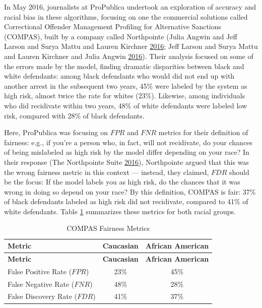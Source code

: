 \documentclass[]{krantz}
\begin{document}
In May 2016, journalists at ProPublica undertook an exploration of
accuracy and racial bias in these algorithms, focusing on one the
commercial solutions called Correctional Offender Management Profiling
for Alternative Sanctions (COMPAS), built by a company called
Northpointe (Julia Angwin and Jeff Larson and Surya Mattu and Lauren
Kirchner \protect\hyperlink{ref-angwin2016}{2016}; Jeff Larson and Surya
Mattu and Lauren Kirchner and Julia Angwin
\protect\hyperlink{ref-larson2016}{2016}). Their analysis focused on
some of the errors made by the model, finding dramatic disparities
between black and white defendants: among black defendants who would did
not end up with another arrest in the subsequent two years, 45\% were
labeled by the system as high risk, almost twice the rate for whites
(23\%). Likewise, among individuals who did recidivate within two years,
48\% of white defendants were labeled low risk, compared with 28\% of
black defendants.

Here, ProPublica was focusing on \(FPR\) and \(FNR\) metrics for their
definition of fairness: e.g., if you're a person who, in fact, will not
recidivate, do your chances of being mislabeled as high risk by the
model differ depending on your race? In their response (The Northpointe
Suite \protect\hyperlink{ref-northpointe2016}{2016}), Northpointe argued
that this was the wrong fairness metric in this context --- instead,
they claimed, \(FDR\) should be the focus: If the model labels you as
high risk, do the chances that it was wrong in doing so depend on your
race? By this definition, COMPAS is fair: 37\% of black defendants
labeled as high risk did not recidivate, compared to 41\% of white
defendants. Table \ref{tab:compastable} summarizes these metrics for
both racial groups.

\begin{longtable}[]{@{}lcc@{}}
\caption{\label{tab:compastable} COMPAS Fairness Metrics}\tabularnewline
\toprule
\textbf{Metric} & \textbf{Caucasian} & \textbf{African
American}\tabularnewline
\midrule
\endfirsthead
\toprule
\textbf{Metric} & \textbf{Caucasian} & \textbf{African
American}\tabularnewline
\midrule
\endhead
False Positive Rate (\(FPR\)) & 23\% & 45\%\tabularnewline
False Negative Rate (\(FNR\)) & 48\% & 28\%\tabularnewline
False Discovery Rate (\(FDR\)) & 41\% & 37\%\tabularnewline
\bottomrule
\end{longtable}
\end{document}
